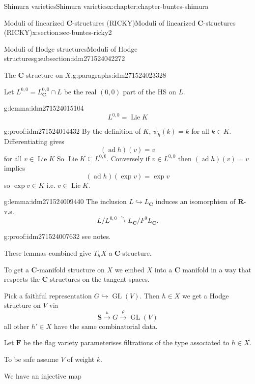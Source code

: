 \documentclass[oneside,10pt,]{book}
\numberwithin{equation}{section}
\DeclareMathOperator{\Lie}{Lie}
\newcommand{\RR}{\mathbf{R}}
\newcommand{\CC}{\mathbf{C}}
\DeclareMathOperator{\ad}{ad}
\DeclareMathOperator{\GL}{GL}
\begin{document}
\begin{chapterptx}{Shimura varieties}{}{Shimura varieties}{}{}{x:chapter:chapter-buntes-shimura}
\begin{sectionptx}{Moduli of linearized \(\CC\)-structures (RICKY)}{}{Moduli of linearized \(\CC\)-structures (RICKY)}{}{}{x:section:sec-buntes-ricky2}
\begin{subsectionptx}{Moduli of Hodge structures}{}{Moduli of Hodge structures}{}{}{g:subsection:idm271524042272}
\begin{paragraphs}{The \(\CC\)-structure on \(X\).}{g:paragraphs:idm271524023328}
\par
Let \(L^{0,0} = L_\CC^{0,0} \cap L\) be the real \((0,0)\) part of the HS on \(L\).%
\begin{lemma}{}{}{g:lemma:idm271524015104}%
%
\begin{equation*}
L^{0,0} = \Lie K
\end{equation*}
%
\end{lemma}
\begin{proofptx}{}{g:proof:idm271524014432}
By the definition of \(K\), \(\psi_h(k) = k\) for all \(k \in K\). Differentiating gives%
\begin{equation*}
(\ad h) (v) = v
\end{equation*}
for all \(v \in \Lie K\) So \(\Lie K  \subseteq L^{0,0}\). Conversely if \(v \in L^{0,0}\) then \((\ad h) (v)=v\) implies%
\begin{equation*}
(\ad h)(\exp v) = \exp v
\end{equation*}
so \(\exp v \in K\) i.e. \(v \in \Lie K\).%
\end{proofptx}
\begin{lemma}{}{}{g:lemma:idm271524009440}%
The inclusion \(L \hookrightarrow L_\CC\) induces an isomorphism of \(\RR\)-v.s.%
\begin{equation*}
L/L^{0,0} \xrightarrow\sim L_\CC / F^0 L_\CC\text{.}
\end{equation*}
%
\end{lemma}
\begin{proofptx}{}{g:proof:idm271524007632}
see notes.%
\end{proofptx}
These lemmas combined give \(T_h X\) a  \(\CC\)-structure.%
\par
To get a \(\CC\)-manifold structure on \(X\) we embed \(X\) into a \(\CC\) manifold in a way that respects the \(\CC\)-structures on the tangent spaces.%
\par
Pick a faithful representation \(G \hookrightarrow \GL(V)\). Then \(h \in X\) we get a Hodge structure on \(V\) via%
\begin{equation*}
\mathbf S \xrightarrow h G \xrightarrow \rho \GL(V)
\end{equation*}
all other \(h' \in X\) have the same combinatorial data.%
\par
Let \(\mathbf F\) be the flag variety parameterises filtrations of the type associated to \(h \in X\).%
\par
To be safe assume \(V\) of weight \(k\).%
\par
We have an injective map%
\begin{equation*}

\end{equation*}
\end{paragraphs}
\end{subsectionptx}
\end{sectionptx}
\end{chapterptx}
\end{document}
